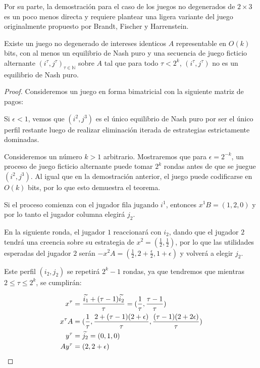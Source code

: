 Por su parte, la demostración para el caso de los juegos no degenerados de $2 \times 3$ es un poco menos directa y requiere plantear una ligera variante del juego originalmente propuesto por Brandt, Fischer y Harrenstein. 

\begin{theorem} \label{teorema:afp:velocidad:nondegen}
    Existe un juego no degenerado de intereses identicos $A$ representable en $O(k)$ bits, con al menos un equilibrio de Nash puro y una secuencia de juego ficticio alternante $(i^\tau, j^\tau)_{\tau \in \mathbb{N}}$ sobre $A$ tal que para todo $\tau < 2^k$, $(i^\tau, j^\tau)$ no es un equilibrio de Nash puro.
\end{theorem}

\begin{proof}
    Consideremos un juego en forma bimatricial con la siguiente matriz de pagos:

    

    Si $\epsilon < 1$, vemos que $(i^2, j^3)$ es el único equilibrio de Nash puro por ser el único perfil restante luego de realizar eliminación iterada de estrategias estrictamente dominadas.

    Consideremos un número $k > 1$ arbitrario. Mostraremos que para $\epsilon = 2^{-k}$, un proceso de juego ficticio alternante puede tomar $2^k$ rondas antes de que se juegue $(i^2, j^3)$. Al igual que en la demostración anterior, el juego puede codificarse en $O(k)$ bits, por lo que esto demuestra el teorema.

    Si el proceso comienza con el jugador fila jugando $i^1$, entonces $x^1B = (1, 2, 0)$ y por lo tanto el jugador columna elegirá $j_2$.

    En la siguiente ronda, el jugador $1$ reaccionará con $i_2$, dando que el jugador $2$ tendrá una creencia sobre su estrategia de $x^2 = (\frac{1}{2},\frac{1}{2})$, por lo que las utilidades esperadas del jugador $2$ serán $-x^2A = (\frac{1}{2}, 2 + \frac{\epsilon}{2}, 1 + \epsilon)$ y volverá a elegir $j_2$.

    Este perfil $(i_2, j_2)$ se repetirá $2^k - 1$ rondas, ya que tendremos que mientras $2 \le \tau \le 2^k$, se cumplirán:

    \begin{align*}
        x^\tau     &= \frac{\widetilde{i_1} + (\tau - 1) \widetilde{i_2}}{\tau} = (\frac{1}{\tau}, \frac{\tau - 1}{\tau}) \\
        x^{\tau}A &= (\frac{1}{\tau}, \frac{2 + (\tau - 1)(2 + \epsilon)}{\tau}, \frac{(\tau - 1)(2 + 2 \epsilon)}{\tau}) \\
        y^\tau     &= \widetilde{j_2} = (0, 1, 0) \\
        Ay^\tau    &= (2, 2 + \epsilon) \\
    \end{align*}


\end{proof}
